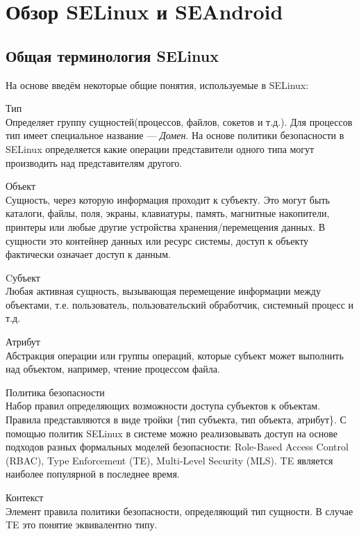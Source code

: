 \section{Обзор SELinux и SEAndroid}
\subsection{Общая терминология SELinux} 

На основе \cite{SEOF} введём некоторые общие понятия, используемые в
SELinux: 
\begin{description}
    \item{Тип} \hfill \\
        Определяет группу сущностей(процессов, файлов, сокетов и т.д.).
        Для процессов тип имеет специальное название — \emph{Домен}. На
        основе политики безопасности в SELinux определяется какие
        операции представители одного типа могут производить над
        представителям другого.  
    \item{Объект}  \hfill \\
        Сущность, через которую информация проходит к субъекту. Это
        могут быть каталоги, файлы, поля, экраны, клавиатуры, память,
        магнитные накопители, принтеры или любые другие устройства
        хранения/перемещения данных. В сущности это контейнер данных или
        ресурс системы, доступ к объекту фактически означает доступ к
        данным.  
    \item{Cубъект}  \hfill \\
        Любая активная сущность, вызывающая перемещение информации между
        объектами, т.е.  пользователь, пользовательский обработчик,
        системный процесс и т.д.  
    \item{Атрибут}  \hfill \\
        Абстракция операции или группы операций, которые субъект может
        выполнить над объектом, например, чтение процессом файла.  
    \item{Политика безопасности}  \hfill \\
        Набор правил определяющих возможности доступа субъектов к
        объектам. Правила представляются в виде тройки \{тип субъекта, тип
        объекта, атрибут\}. С помощью политик SELinux в системе можно
        реализовывать доступ на основе подходов разных формальных
        моделей безопасности: Role-Based Access Control (RBAC), Type
        Enforcement (TE), Multi-Level Security (MLS). TE является
        наиболее популярной в последнее время.   
    \item{Контекст}  \hfill \\
        Элемент правила политики безопасности, определяющий тип
        сущности. В случае TE это понятие эквивалентно типу.
\end{description}

